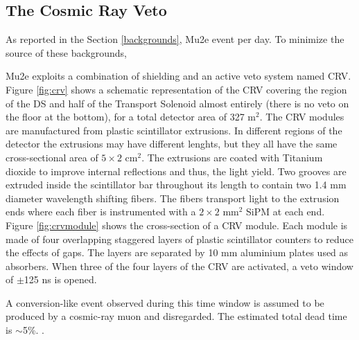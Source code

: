 \subsection{The Cosmic Ray Veto}\label{CRV}
As reported in the Section \ref{backgrounds},  Mu2e 
 event per day. 
{\red To minimize the source of these backgrounds,}

Mu2e exploits a combination of  shielding and an active 
veto system named CRV. Figure \ref{fig:crv} shows a 
schematic representation of 
the CRV covering the region of the DS and half of the Transport Solenoid 
almost entirely (there is no veto on the floor at the bottom), for a total detector area
of  327 m$^2$.
The CRV modules are manufactured from plastic scintillator extrusions. 
In  different regions of the detector the extrusions may have different lenghts, 
but they all have the same cross-sectional area of $5 \times 2$ cm$^2$.
The extrusions 
are coated with Titanium dioxide to improve internal reflections and thus, the light yield. 
Two grooves are extruded inside the scintillator bar throughout its length to contain two 
1.4 mm diameter wavelength shifting fibers. The fibers transport light to the extrusion 
ends where each fiber is instrumented with a $2 \times 2$ mm$^2$ SiPM at each end. Figure \ref{fig:crvmodule} 
shows the cross-section of a CRV module. Each module is made of four overlapping staggered layers 
of plastic scintillator counters to reduce the effects of gaps. The 
layers are separated by 10 mm aluminium plates used as absorbers. 
{\red When three of the four layers of the CRV are activated, a veto window of $\pm$125 ns is opened.}

A conversion-like event observed during this time window is assumed to be produced by a cosmic-ray muon
and  disregarded. 
The estimated total dead time is $\sim$5\%.
 .

